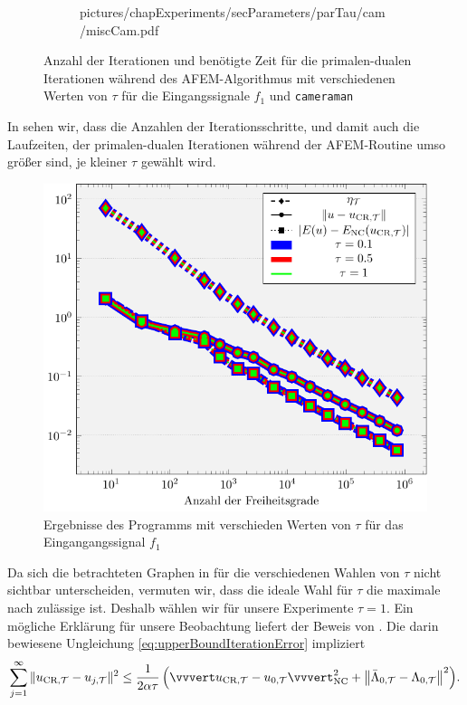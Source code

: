 \begin{figure}[p]
\begin{subfigure}[b]{.48\linewidth}
      {pictures/chapExperiments/secParameters/parTau/cam/miscCam.pdf}
    \label{fig:parTauMiscCam}
  \end{subfigure}
  \caption{Anzahl der Iterationen und benötigte Zeit für die primalen-dualen
    Iterationen während des AFEM-Algorithmus mit verschiedenen Werten von
    $\tau$ für die Eingangssignale $f_1$ und \texttt{cameraman}} 
  \label{fig:parTauMisc}
\end{figure}
In  sehen wir, dass die Anzahlen der Iterationsschritte,
und damit auch die Laufzeiten, der primalen-dualen Iterationen während der
AFEM-Routine umso größer sind, je kleiner $\tau$ gewählt wird.
\begin{figure}[p]
  \centering
  \includegraphics[width=.8\linewidth]
    {pictures/chapExperiments/secParameters/parTau/f01/convergenceF.pdf}
  \caption{Ergebnisse des Programms mit verschieden Werten von $\tau$ für das
    Eingangangssignal $f_1$}
  \label{fig:parTauConvergence}
\end{figure}
Da sich die betrachteten Graphen in  für die
verschiedenen Wahlen von $\tau$ nicht sichtbar unterscheiden, vermuten wir,
dass die ideale Wahl für $\tau$ die maximale nach
 zulässige ist.
Deshalb wählen wir für unsere Experimente $\tau=1$.
Ein mögliche Erklärung für unsere Beobachtung liefert der Beweis von
.
Die darin bewiesene Ungleichung \eqref{eq:upperBoundIterationError} impliziert
\begin{align}
  \label{eq:nrIterationsInequality}
  \sum_{j=1}^\infty\Vert \ucrt - \ujt \Vert^2 
  \leq
  \frac{1}{2\alpha\tau}
  \left(\vvvert \ucrt - u_{0,\Tcal}\vvvert^2_\nc 
  + \left\Vert \bar\Lambda_{0,\Tcal} - \Lambda_{0,\Tcal}\right\Vert^2\right)\!. 
\end{align}
